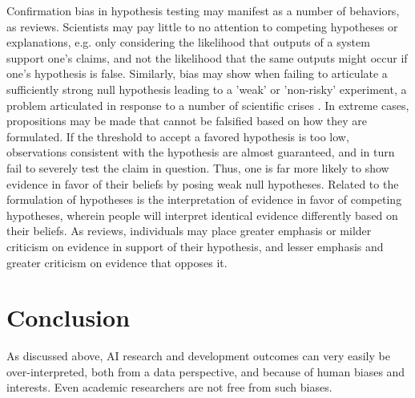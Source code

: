 \documentclass{article}
\theoremstyle{plain}
\theoremstyle{definition}
\theoremstyle{remark}
\begin{document}
Confirmation bias in hypothesis testing may manifest as a number of behaviors, as \citet{nickerson1998confirmation} reviews. Scientists may pay little to no attention to competing hypotheses or explanations, e.g. only considering the likelihood that outputs of a system support one's claims, and not the likelihood that the same outputs might occur if one's hypothesis is false. Similarly, bias may show when failing to articulate a sufficiently strong null hypothesis leading to a 'weak' or 'non-risky' experiment, a problem articulated in response to a number of scientific crises \cite{claesen2022severity}. In extreme cases, propositions may be made that cannot be falsified based on how they are formulated. If the threshold to accept a favored hypothesis is too low, observations consistent with the hypothesis are almost guaranteed, and in turn fail to severely test the claim in question. Thus, one is far more likely to show evidence in favor of their beliefs by posing weak null hypotheses. Related to the formulation of hypotheses is the interpretation of evidence in favor of competing hypotheses, wherein people will interpret identical evidence differently based on their beliefs. As \citet{nickerson1998confirmation} reviews, individuals may place greater emphasis or milder criticism on evidence in support of their hypothesis, and lesser emphasis and greater criticism on evidence that opposes it. 


\section{Conclusion}
As discussed above, AI research and development outcomes can very easily be over-interpreted, both from a data perspective, and because of human biases and interests. Even academic researchers are not free from such biases.
\end{document}
